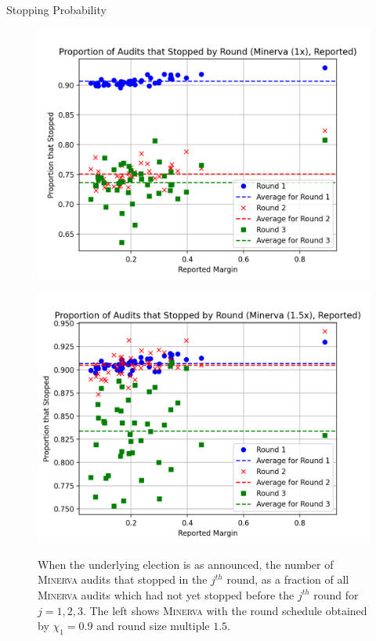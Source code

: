 \documentclass[final]{beamer}
\newcommand{\Minerva}{\textsc{Minerva}\xspace}
\newlength{\colwidth}
\begin{document}
\begin{frame}[t]
\begin{columns}[t]
\begin{column}{\colwidth}
\begin{block}{Stopping Probability}
\begin{figure}[h]
\centering
\begin{minipage}{.49\textwidth}
\includegraphics[width=1\textwidth]{minerva_multiround_1x_10^4/sprobs_first_three.png}
\label{fig:minerva1_sprob}
\end{minipage}
\begin{minipage}{.49\textwidth}
\includegraphics[width=1\textwidth]{minerva_multiround_1p5x_10^4/sprobs_first_three.png}
\label{fig:minerva1p5_sprob}
\end{minipage}
\caption{When the underlying election is as announced, the number of \Minerva audits that stopped in the $j^{th}$ round, as a fraction of all \Minerva audits which had not yet stopped before the $j^{th}$ round for $j=1,2,3$. The left shows \Minerva with the round schedule obtained by $\chi_1=0.9$ and round size multiple $1.5$.}
\end{figure}


\end{block}
\end{column}
\end{columns}
\end{frame}
\end{document}
